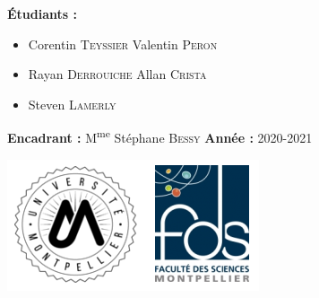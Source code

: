 \documentclass[twoside]{report}
\begin{document}
\begin{titlepage}

\vspace{1.7cm}
\large{\textbf{Étudiants :}}
\begin{itemize}[label=]
    \setlength\itemsep{0em}
    \item \large{Corentin \textsc{Teyssier}}
    \hfill \large{Valentin \textsc{Peron}}
    \item \large{Rayan \textsc{Derrouiche}} 
    \hfill \large{Allan \textsc{Crista}}
    \item \large{Steven \textsc{Lamerly}}
\end{itemize}

\vspace{0.5cm}
\large{\textbf{Encadrant :}}
\large{M\textsuperscript{me} Stéphane \textsc{Bessy}}
\hfill
\large{\textbf{Année :} 2020-2021}


\vspace{0.8cm}
\begin{center}
\includegraphics[scale=0.6]{logoFDS.png}
\end{center}


\end{titlepage}

\setcounter{page}{1}
\setcounter{tocdepth}{1}
\tableofcontents

\renewcommand{\chaptername}{Partie}
\end{document}
